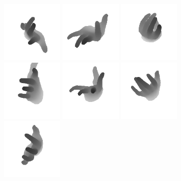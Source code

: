 \begin{figure}
    \includegraphics[width=110px]{figs/mano/7.png}
    \includegraphics[width=110px]{figs/mano/8.png}
    \includegraphics[width=110px]{figs/mano/9.png}
    \includegraphics[width=110px]{figs/mano/10.png}
    \includegraphics[width=110px]{figs/mano/11.png}
    \includegraphics[width=110px]{figs/mano/12.png}
    \includegraphics[width=110px]{figs/mano/13.png}

\end{figure}
